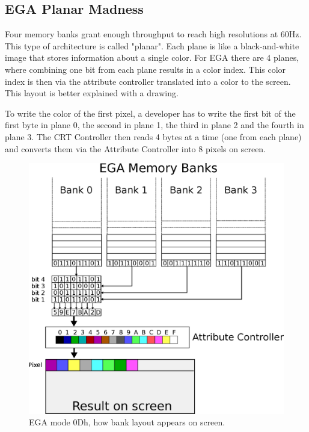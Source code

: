 \documentclass[book.tex]{subfiles}
\begin{document}
\subsection{EGA Planar Madness}
\label{section:EGA_Planar_Madness}

Four memory banks grant enough throughput to reach high resolutions at 60Hz. This type of architecture is called "planar". Each plane is like a black-and-white image that stores information about a single color. For EGA there are 4 planes, where combining one bit from each plane results in a color index. This color index is then via the attribute controller translated into a color to the screen. This layout is better explained with a drawing.\\

\par
To write the color of the first pixel, a developer has to write the first bit of the first byte in plane 0, the second in plane 1, the third in plane 2 and the fourth in plane 3. The CRT Controller then reads 4 bytes at a time (one from each plane) and converts them via the Attribute Controller into 8 pixels on screen. \\


\begin{figure}[H]
\centering
 \includegraphics[width=1.0\textwidth]{imgs/drawings/mode0Dh.eps}
\caption{EGA mode 0Dh, how bank layout appears on screen.}
\label{fig:ega_bank_layout}
\end{figure}
 
\end{document}

